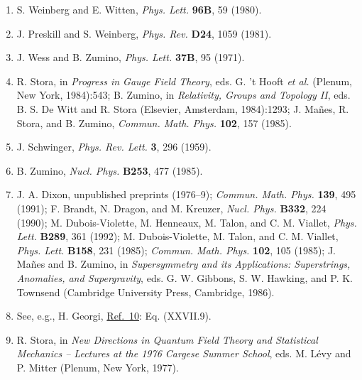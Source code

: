\begin{enumerate}
\item[16a.] \label{ch22-ref-16a}
S. Weinberg and E. Witten, \emph{Phys. Lett.} \textbf{96B}, 59 (1980).

\item {}\label{ch22-ref-17}
J. Preskill and S. Weinberg, \emph{Phys. Rev.} \textbf{D24}, 1059 (1981).

\item {}\label{ch22-ref-18}
J. Wess and B. Zumino, \emph{Phys. Lett.} \textbf{37B}, 95 (1971).

\item[18a.] \label{ch22-ref-18a}
R. Stora, in \emph{Progress in Gauge Field Theory}, eds. G. 't Hooft
\emph{et al.} (Plenum, New York, 1984):543; B. Zumino, in
\emph{Relativity, Groups and Topology II}, eds. B. S. De Witt and
R. Stora (Elsevier, Amsterdam, 1984):1293; J. Ma\~nes, R. Stora, and
B. Zumino, \emph{Commun. Math. Phys.} \textbf{102}, 157 (1985).

\item[18b.] \label{ch22-ref-18b}
J. Schwinger, \emph{Phys. Rev. Lett.} \textbf{3}, 296 (1959).

\item[18c.] \label{ch22-ref-18c}
B. Zumino, \emph{Nucl. Phys.} \textbf{B253}, 477 (1985).

\item {}\label{ch22-ref-19}
J. A. Dixon, unpublished preprints (1976--9); \emph{Commun. Math. Phys.}
\textbf{139}, 495 (1991); F. Brandt, N. Dragon, and M. Kreuzer,
\emph{Nucl. Phys.} \textbf{B332}, 224 (1990); M. Dubois-Violette,
M. Henneaux, M. Talon, and C. M. Viallet, \emph{Phys. Lett.}
\textbf{B289}, 361 (1992); M. Dubois-Violette, M. Talon, and
C. M. Viallet, \emph{Phys. Lett.} \textbf{B158}, 231 (1985);
\emph{Commun. Math. Phys.} \textbf{102}, 105 (1985); J. Ma\~nes and
B. Zumino, in \emph{Supersymmetry and its Applications: Superstrings,
Anomalies, and Supergravity}, eds. G. W. Gibbons, S. W. Hawking, and
P. K. Townsend (Cambridge University Press, Cambridge, 1986).

\item[19a.] \label{ch22-ref-19a}
See, e.g., H. Georgi, \hyperref[ch22-ref-10]{Ref.~10}: Eq. (XXVII.9).

\item {}\label{ch22-ref-20}
R. Stora, in \emph{New Directions in Quantum Field Theory and Statistical
Mechanics -- Lectures at the 1976 Cargese Summer School}, eds. M. L\'evy
and P. Mitter (Plenum, New York, 1977).


\end{enumerate}

